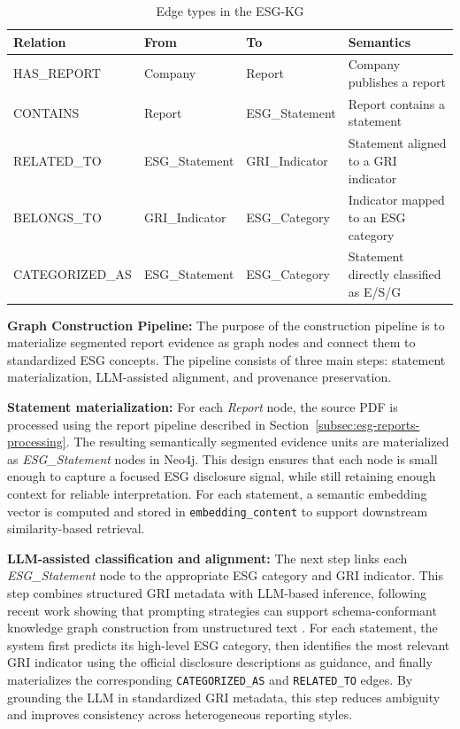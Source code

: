 \documentclass[sn-mathphys, oneside]{sn-jnl}
\begin{document}
\begin{table}[htbp]
\centering
\caption{Edge types in the ESG-KG}
\label{tab:edges}
\begin{tabular}{llll}
\hline
\textbf{Relation} & \textbf{From} & \textbf{To} & \textbf{Semantics} \\
\hline
HAS\_REPORT      & Company        & Report         & Company publishes a report \\
CONTAINS         & Report         & ESG\_Statement & Report contains a statement \\
RELATED\_TO      & ESG\_Statement & GRI\_Indicator & Statement aligned to a GRI indicator \\
BELONGS\_TO      & GRI\_Indicator & ESG\_Category  & Indicator mapped to an ESG category \\
CATEGORIZED\_AS  & ESG\_Statement & ESG\_Category  & Statement directly classified as E/S/G \\
\hline
\end{tabular}
\end{table}

\textbf{Graph Construction Pipeline:} The purpose of the construction pipeline is to materialize segmented report evidence as
graph nodes and connect them to standardized ESG concepts. The pipeline consists of
three main steps: statement materialization, LLM-assisted alignment, and provenance
preservation.

\textbf{Statement materialization:}
For each \textit{Report} node, the source PDF is processed using the report pipeline
described in Section~\ref{subsec:esg-reports-processing}. The resulting semantically
segmented evidence units are materialized as \textit{ESG\_Statement} nodes in Neo4j.
This design ensures that each node is small enough to capture a focused ESG disclosure
signal, while still retaining enough context for reliable interpretation. For each
statement, a semantic embedding vector is computed and stored in
\texttt{embedding\_content} to support downstream similarity-based retrieval.

\textbf{LLM-assisted classification and alignment:}
The next step links each \textit{ESG\_Statement} node to the appropriate ESG category
and GRI indicator. This step combines structured GRI metadata with LLM-based inference,
following recent work showing that prompting strategies can support schema-conformant
knowledge graph construction from unstructured text
\cite{carta2023iterative,trajanoska2023enhancing}. For each statement, the system first
predicts its high-level ESG category, then identifies the most relevant GRI indicator
using the official disclosure descriptions as guidance, and finally materializes the
corresponding \texttt{CATEGORIZED\_AS} and \texttt{RELATED\_TO} edges. By grounding the
LLM in standardized GRI metadata, this step reduces ambiguity and improves consistency
across heterogeneous reporting styles.
\end{document}
